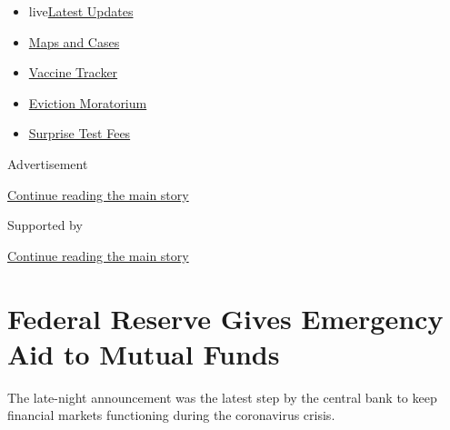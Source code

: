 \begin{itemize}
\tightlist
\item
  live\href{https://www.nytimes3xbfgragh.onion/2020/09/09/world/covid-19-coronavirus.html?name=styln-coronavirus-markets\&region=TOP_BANNER\&block=storyline_menu_recirc\&action=click\&pgtype=Article\&impression_id=210a1421-f2c1-11ea-b3b4-c348a9290e32\&variant=undefined}{Latest
  Updates}
\item
  \href{https://www.nytimes3xbfgragh.onion/interactive/2020/us/coronavirus-us-cases.html?name=styln-coronavirus-markets\&region=TOP_BANNER\&block=storyline_menu_recirc\&action=click\&pgtype=Article\&impression_id=210a3b30-f2c1-11ea-b3b4-c348a9290e32\&variant=undefined}{Maps
  and Cases}
\item
  \href{https://www.nytimes3xbfgragh.onion/interactive/2020/science/coronavirus-vaccine-tracker.html?name=styln-coronavirus-markets\&region=TOP_BANNER\&block=storyline_menu_recirc\&action=click\&pgtype=Article\&impression_id=210a3b31-f2c1-11ea-b3b4-c348a9290e32\&variant=undefined}{Vaccine
  Tracker}
\item
  \href{https://www.nytimes3xbfgragh.onion/2020/09/02/your-money/eviction-moratorium-covid.html?name=styln-coronavirus-markets\&region=TOP_BANNER\&block=storyline_menu_recirc\&action=click\&pgtype=Article\&impression_id=210a3b32-f2c1-11ea-b3b4-c348a9290e32\&variant=undefined}{Eviction
  Moratorium}
\item
  \href{https://www.nytimes3xbfgragh.onion/2020/09/09/upshot/coronavirus-surprise-test-fees.html?name=styln-coronavirus-markets\&region=TOP_BANNER\&block=storyline_menu_recirc\&action=click\&pgtype=Article\&impression_id=210a3b33-f2c1-11ea-b3b4-c348a9290e32\&variant=undefined}{Surprise
  Test Fees}
\end{itemize}

Advertisement

\protect\hyperlink{after-top}{Continue reading the main story}

Supported by

\protect\hyperlink{after-sponsor}{Continue reading the main story}

\hypertarget{federal-reserve-gives-emergency-aid-to-mutual-funds}{%
\section{Federal Reserve Gives Emergency Aid to Mutual
Funds}\label{federal-reserve-gives-emergency-aid-to-mutual-funds}}

The late-night announcement was the latest step by the central bank to
keep financial markets functioning during the coronavirus crisis.

